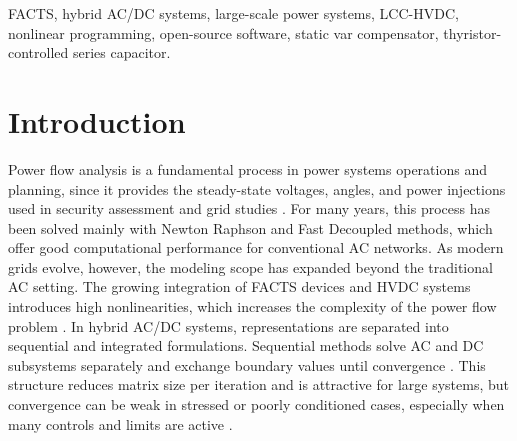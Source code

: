 \documentclass[letterpaper,journal]{IEEEtran}
\begin{document}
\begingroup
{}
\begin{abstract}
	This paper introduces an open-source optimization-based integrated AC/DC power flow model for complex hybrid grids such as the Brazilian Interconnected Power System (BIPS). The nonlinear programming (NLP) formulation combines AC balance, detailed steady-state line-commutated converter (LCC), and FACTS equations. Signed residual variables, bounded both per bus and in aggregate, provide a measurable feasibility criterion while weighted regularization keeps the solution near the scheduled operating state. The model was implemented in Python/Pyomo, solved with Ipopt, and validated against Anarede on an equivalent BIPS case. Scalability tests converged for all six cases, including three 11,250-bus snapshots in 21.3--23.2~s total time. In direct load-stress tests, the NLP solved five of nine scenarios, compared with three of nine for Newton-based entries, although all solved benchmark points retained voltage or branch-limit violations. The results therefore support improved numerical robustness and large-system tractability, while separating power-balance convergence from operational acceptability.

\end{abstract}
\endgroup

\begin{IEEEkeywords}
	FACTS, hybrid AC/DC systems, large-scale power systems, LCC-HVDC, nonlinear programming, open-source software, static var compensator, thyristor-controlled series capacitor.
\end{IEEEkeywords}

\section{Introduction}


Power flow analysis is a fundamental process in power systems operations and planning, since it provides the steady-state voltages,
angles, and power injections used in security assessment and grid studies \cite{ref1}. For many years, this process has been solved mainly
with Newton Raphson and Fast Decoupled methods, which offer good computational performance for conventional AC networks. As modern grids evolve,
however, the modeling scope has expanded beyond the traditional AC setting. The growing integration of FACTS devices and HVDC systems introduces
high nonlinearities, which increases the complexity of the power flow problem \cite{ref2}.
In hybrid AC/DC systems, representations are separated into sequential and integrated formulations. Sequential methods solve AC and DC
subsystems separately and exchange boundary values until convergence \cite{ref3}. This structure reduces matrix size per iteration and is
attractive for large systems, but convergence can be weak in stressed or poorly conditioned cases, especially when many controls and limits
are active \cite{ref4}.
\end{document}
